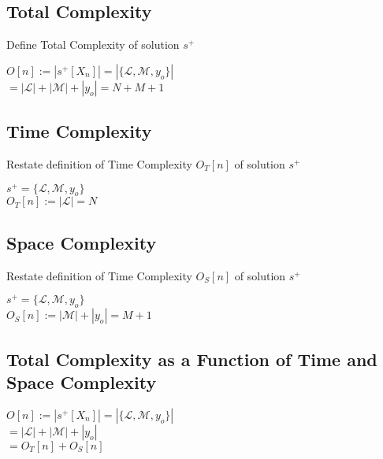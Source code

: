 \documentclass[11pt]{article}
\begin{document}
\subsection{Total Complexity}
Define Total Complexity of solution $s^+$
\begin{center}
$O[n] :=  |s^+[X_n]| = |\{\mathcal{L},\mathcal{M},y_o\}|$
\\ \vspace{4mm}
$
= |\mathcal{L}| + |\mathcal{M}| + |y_o| = N + M + 1
$
\end{center}






\subsection{Time Complexity}
Restate definition of Time Complexity $O_T[n]$ of solution $s^+$
\begin{center}
$
s^+ = \{ \mathcal{L},\mathcal{M},y_o\}
$
\\ \vspace{3mm}
$
O_T[n] := |\mathcal{L}| = N
$
\end{center}



\subsection{Space Complexity}
Restate definition of Time Complexity $O_S[n]$ of solution $s^+$
\begin{center}
$
s^+ = \{ \mathcal{L},\mathcal{M},y_o\}
$
\\ \vspace{2mm}
$
O_S[n] := |\mathcal{M}| + |y_o| = M + 1
$
\end{center}



\subsection{Total Complexity as a Function of Time and Space Complexity}
\begin{center}
\vspace{4mm}
$
O[n] :=  |s^+[X_n]| = |\{\mathcal{L},\mathcal{M},y_o\}|
$
\\ \vspace{2mm}
$
= |\mathcal{L}| + |\mathcal{M}| + |y_o|
$
\\ \vspace{2mm}
$
= O_T[n] + O_S[n]
$
\end{center}
\end{document}
